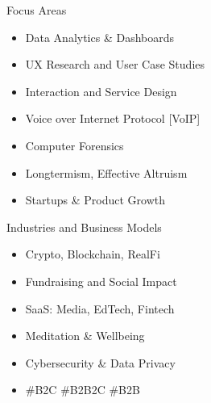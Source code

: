 

Focus Areas %
\vspace*{-0.8em}
\begin{itemize}
 \setlength\itemsep{-0.3em}
\item Data Analytics \& %
Dashboards  %
\item UX Research and User Case Studies
\item Interaction and Service Design
\item Voice over Internet Protocol [VoIP]
\item Computer Forensics
\item Longtermism, Effective Altruism
\item Startups \& Product Growth
\end{itemize}

Industries and Business Models
\vspace*{-0.8em}
\begin{itemize}
 \setlength\itemsep{-0.3em}
\item Crypto, Blockchain, RealFi
\item Fundraising and Social Impact %
\item SaaS: Media, EdTech, Fintech
\item Meditation \& Wellbeing
\item Cybersecurity \& Data Privacy
\item \#B2C \#B2B2C \#B2B
\end{itemize}


